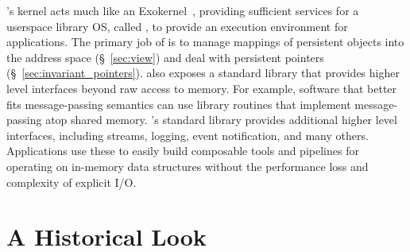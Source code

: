 {    \Twizzler's kernel acts much like an
    Exokernel~\cite{Kaashoek,engler:sosp95}, providing sufficient services for a
    userspace library OS, called \emph{\libcore}, to provide an execution environment for applications.
    The primary job of \libcore is to manage mappings of persistent objects into the address space (\S~\ref{sec:view})
    and deal with persistent pointers (\S~\ref{sec:invariant_pointers}).
    \Twizzler also exposes a standard library that
    provides higher level interfaces beyond raw access to memory. For example, software that better fits
    message-passing semantics can use library routines that implement message-passing atop shared
    memory. \Twizzler's standard library provides additional
    higher level interfaces, including streams, logging, event notification, and many
    others. Applications use these to easily build composable tools and pipelines for
    operating on in-memory data structures without the performance loss and complexity of explicit I/O\@.

}

\section{A Historical Look}


